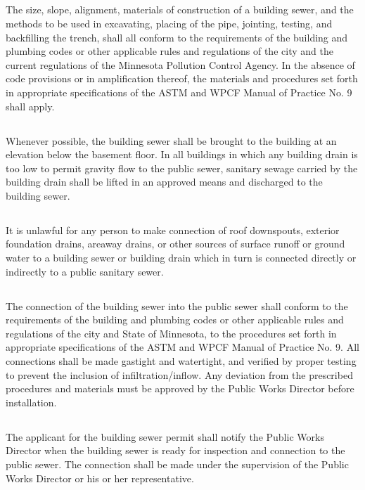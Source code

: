 \documentclass[code.tex]{subfiles}
\begin{document}
\subsection{}
The size, slope, alignment, materials of construction of a building sewer, and the methods to be used in excavating, placing of the pipe, jointing, testing, and backfilling the trench, shall all conform to the requirements of the building and plumbing codes or other applicable rules and regulations of the city and the current regulations of the Minnesota Pollution Control Agency.  In the absence of code provisions or in amplification thereof, the materials and procedures set forth in appropriate specifications of the ASTM and WPCF Manual of Practice No. 9 shall apply.
\subsection{}
Whenever possible, the building sewer shall be brought to the building at an elevation below the basement floor.  In all buildings in which any building drain is too low to permit gravity flow to the public sewer, sanitary sewage carried by the building drain shall be lifted in an approved means and discharged to the building sewer.
\subsection{}
It is unlawful for any person to make connection of roof downspouts, exterior foundation drains, areaway drains, or other sources of surface runoff or ground water to a building sewer or building drain which in turn is connected directly or indirectly to a public sanitary sewer.
\subsection{}
The connection of the building sewer into the public sewer shall conform to the requirements of the building and plumbing codes or other applicable rules and regulations of the city and State of Minnesota, to the procedures set forth in appropriate specifications of the ASTM and WPCF Manual of Practice No. 9.  All connections shall be made gastight and watertight, and verified by proper testing to prevent the inclusion of infiltration/inflow.  Any deviation from the prescribed procedures and materials must be approved by the Public Works Director before installation.
\subsection{}
The applicant for the building sewer permit shall notify the Public Works Director when the building sewer is ready for inspection and connection to the public sewer.  The connection shall be made under the supervision of the Public Works Director or his or her representative.
\end{document}
